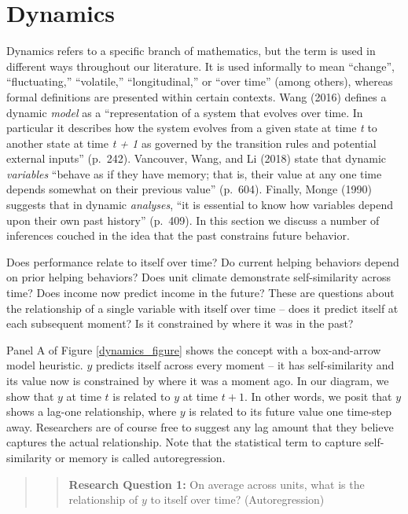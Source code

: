 \documentclass[english,,man]{apa6}
\theoremstyle{definition}
\theoremstyle{definition}
\theoremstyle{definition}
\theoremstyle{remark}
\begin{document}
\hypertarget{dynamics}{%
\section{Dynamics}\label{dynamics}}

Dynamics refers to a specific branch of mathematics, but the term is
used in different ways throughout our literature. It is used informally
to mean \enquote{change}, \enquote{fluctuating,} \enquote{volatile,}
\enquote{longitudinal,} or \enquote{over time} (among others), whereas
formal definitions are presented within certain contexts. Wang (2016)
defines a dynamic \emph{model} as a \enquote{representation of a system
that evolves over time. In particular it describes how the system
evolves from a given state at time \emph{t} to another state at time
\emph{t + 1} as governed by the transition rules and potential external
inputs} (p.~242). Vancouver, Wang, and Li (2018) state that dynamic
\emph{variables} \enquote{behave as if they have memory; that is, their
value at any one time depends somewhat on their previous value}
(p.~604). Finally, Monge (1990) suggests that in dynamic
\emph{analyses}, \enquote{it is essential to know how variables depend
upon their own past history} (p.~409). In this section we discuss a
number of inferences couched in the idea that the past constrains future
behavior.

Does performance relate to itself over time? Do current helping
behaviors depend on prior helping behaviors? Does unit climate
demonstrate self-similarity across time? Does income now predict income
in the future? These are questions about the relationship of a single
variable with itself over time -- does it predict itself at each
subsequent moment? Is it constrained by where it was in the past?

Panel A of Figure \ref{dynamics_figure} shows the concept with a
box-and-arrow model heuristic. \(y\) predicts itself across every moment
-- it has self-similarity and its value now is constrained by where it
was a moment ago. In our diagram, we show that \(y\) at time \(t\) is
related to \(y\) at time \(t + 1\). In other words, we posit that \(y\)
shows a lag-one relationship, where \(y\) is related to its future value
one time-step away. Researchers are of course free to suggest any lag
amount that they believe captures the actual relationship. Note that the
statistical term to capture self-similarity or memory is called
autoregression.

\begin{quote}
\begin{quote}
\textbf{Research Question 1:} On average across units, what is the
relationship of \(y\) to itself over time? (Autoregression)
\end{quote}
\end{quote}
\end{document}
